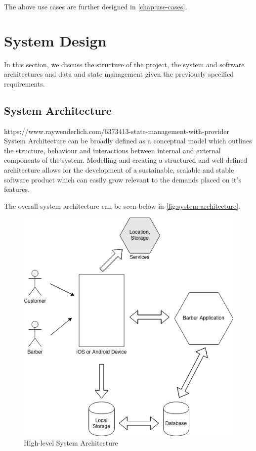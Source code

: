 \documentclass[12pt]{article}
\begin{document}
	The above use cases are further designed in \autoref{chap:use-cases}.

	
	\section{System Design}
	In this section, we discuss the structure of the project, the system and software architectures and data and state management given the previously specified requirements. 
	
	
	\subsection{System Architecture}
	https://www.raywenderlich.com/6373413-state-management-with-provider
	System Architecture can be broadly defined as a conceptual model which outlines the structure, behaviour and interactions between internal and external components of the system. Modelling and creating a structured and well-defined architecture allows for the development of a sustainable, scalable and stable software product which can easily grow relevant to the demands placed on it's features.
	
	The overall system architecture can be seen below in \autoref{fig:system-architecture}.
	
	\begin{figure}[H]
		\centering
		\includegraphics[scale=0.7]{images/system-architecture.png}
		\caption{High-level System Architecture}
		\label{fig:system-architecture}
	\end{figure}
	
\end{document}
